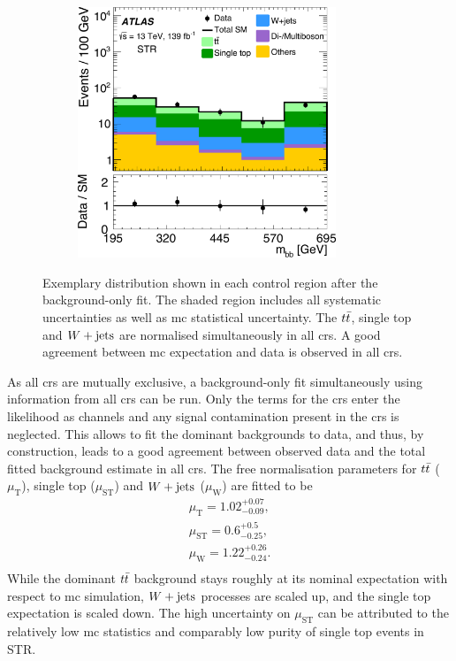 \begin{figure}
\begin{subfigure}[b]{0.5\linewidth}
		\centering\includegraphics[width=0.85\textwidth]{OneLeptonbb_CR_STCREM_mbb_yellow}
	\end{subfigure}\hfill

	\caption{Exemplary distribution shown in each control region after the background-only fit. The shaded region includes all systematic uncertainties as well as \gls{mc} statistical uncertainty. The $t\bar{t}$, single top and $W+\mathrm{jets}$ are normalised simultaneously in all \glspl{cr}. A good agreement between \gls{mc} expectation and data is observed in all \glspl{cr}.}
	\label{fig:CR_distributions_postfit}
\end{figure}



As all \glspl{cr} are mutually exclusive, a background-only fit simultaneously using information from all \glspl{cr} can be run. Only the terms for the \glspl{cr} enter the likelihood as channels and any signal contamination present in the \glspl{cr} is neglected. This allows to fit the dominant backgrounds to data, and thus, by construction, leads to a good agreement between observed data and the total fitted background estimate in all \glspl{cr}. The free normalisation parameters for $t\bar{t}$ ($\mu_\mathrm{T}$), single top ($\mu_\mathrm{ST}$) and $W+\mathrm{jets}$ ($\mu_\mathrm{W}$) are fitted to be
\begin{equation}
	\begin{split}
		\mu_\mathrm{T} = 1.02^{+0.07}_{-0.09}, \\
		\mu_\mathrm{ST} = 0.6^{+0.5}_{-0.25}, \\
		\mu_\mathrm{W} = 1.22^{+0.26}_{-0.24}. \\
	\end{split}
\end{equation}
While the dominant $t\bar{t}$ background stays roughly at its nominal expectation with respect to \gls{mc} simulation, $W+\mathrm{jets}$ processes are scaled up, and the single top expectation is scaled down. The high uncertainty on $\mu_\mathrm{ST}$ can be attributed to the relatively low \gls{mc} statistics and comparably low purity of single top events in STR.

